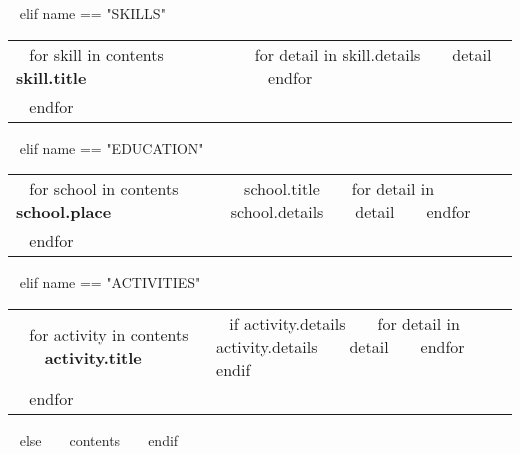 \begin{minipage}{\textwidth}
~{ elif name == "SKILLS" }~
  \begin{tabular}{ @{} p{32mm} p{135mm} @{} }
  ~{ for skill in contents }~
    \bf\small ~{{ skill.title }}~ & {\small
    ~{ for detail in skill.details }~
        ~{{ detail }}~
    ~{ endfor }~
    } \\
  ~{ endfor }~
  \end{tabular}
  \vspace{10mm}

~{ elif name == "EDUCATION" }~
  \begin{tabular}{ @{} p{32mm} p{135mm} @{} }
  ~{ for school in contents }~
    \bf\small ~{{ school.place }}~ & {\small
    ~{{ school.title }}~
    ~{ for detail in school.details }~
        ~{{ detail }}~
    ~{ endfor }~
    } \\
  ~{ endfor }~
  \end{tabular}
  \vspace{10mm}

~{ elif name == "ACTIVITIES" }~
  \begin{tabular}{ @{} p{32mm} p{135mm} @{} }
  ~{ for activity in contents }~
    \bf\small ~{{ activity.title }}~ & {\small
    ~{ if activity.details }~
        ~{ for detail in activity.details }~
            ~{{ detail }}~
        ~{ endfor }~
    ~{ endif }~
    } \\
  ~{ endfor }~
  \end{tabular}
  \vspace{10mm}

~{ else }~
  ~{{ contents }}~
  \bigskip
~{ endif }~
\end{minipage}
